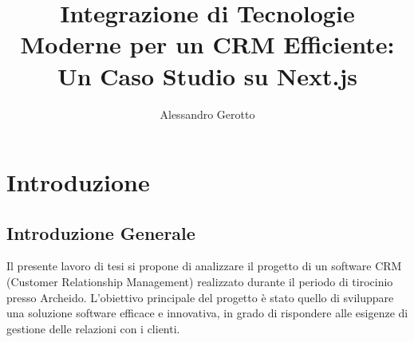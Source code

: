 \documentclass[target=bach,aauheader=,style=]{thud}
\title{Integrazione di Tecnologie Moderne per un CRM Efficiente: Un Caso Studio su Next.js}
\author{Alessandro Gerotto}
\begin{document}
\maketitle



\tableofcontents



\mainmatter

\chapter{Introduzione}
\section{Introduzione Generale}
Il presente lavoro di tesi si propone di analizzare il progetto di un software CRM (Customer Relationship Management) realizzato durante il periodo di tirocinio presso Archeido. L'obiettivo principale del progetto è stato quello di sviluppare una soluzione software efficace e innovativa, in grado di rispondere alle esigenze di gestione delle relazioni con i clienti. 
\end{document}
